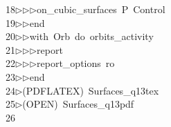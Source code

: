\begin{tabbing}
18\>$\triangleright$\>$\triangleright$\>$\triangleright$\>on\_cubic\_surfaces\ P\ Control\ \\[0pt]
19\>$\triangleright$\>$\triangleright$\>end\ \\[0pt]
20\>$\triangleright$\>$\triangleright$\>with\ Orb\ do\ orbits\_activity\ \\[0pt]
21\>$\triangleright$\>$\triangleright$\>$\triangleright$\>report\ \\[0pt]
22\>$\triangleright$\>$\triangleright$\>$\triangleright$\>report\_options\ ro\ \\[0pt]
23\>$\triangleright$\>$\triangleright$\>end\\[0pt]
24\>$\triangleright$\>(PDFLATEX)\ Surfaces\_q13tex\ \\[0pt]
25\>$\triangleright$\>(OPEN)\ Surfaces\_q13pdf\\[0pt]
26\>\end{tabbing}

